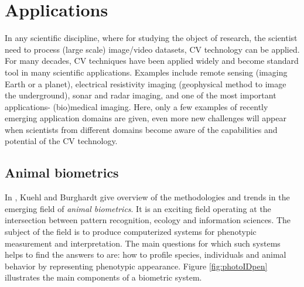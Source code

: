 \section{Applications}
\label{sec:app}

In any scientific discipline, where for studying the object of research, the scientist need to process (large scale) image/video datasets, CV technology can be applied.  For many decades, CV techniques have been applied widely and become standard tool in many scientific applications. Examples include remote sensing (imaging Earth or a planet), electrical resistivity imaging (geophysical method to image the underground), sonar and radar imaging, and one of the most important applications- (bio)medical imaging. Here, only a few examples of recently emerging application domains are given, even more new challenges will appear when scientists from different domains become aware of the capabilities and potential of the CV technology.

\subsection{Animal biometrics}
\label{sec:anim_biom}
In \cite{Kuehl2013}, Kuehl and Burghardt give overview of the methodologies and trends in the emerging field of {\em animal biometrics}. It is an exciting field operating at the intersection between pattern recognition, ecology and information sciences. The subject of the field is to produce computerized systems for phenotypic measurement and interpretation. The main questions for which such systems helps to find the answers to are: how to profile species, individuals and animal behavior by representing phenotypic appearance. Figure \ref{fig:photoIDpen} illustrates the main components of a biometric system. 

